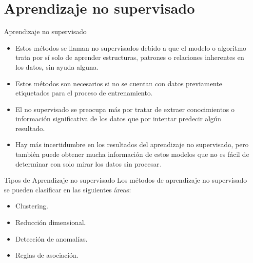 \documentclass[11pt,aspectratio=169]{beamer}
\begin{document}
\section{Aprendizaje no supervisado}
\begin{frame}{Aprendizaje no supervisado}
\begin{itemize}
	\item Estos métodos se llaman no supervisados debido a que el modelo o algoritmo trata por sí solo de aprender estructuras, 
		patrones o relaciones inherentes en los datos, sin ayuda alguna. \pause
	\item Estos métodos son necesarios si no se cuentan con datos previamente etiquetados para el proceso de entrenamiento.\pause
	\item El no supervisado se preocupa más por tratar de extraer conocimientos o información significativa de los datos que por intentar 
		predecir algún resultado.\pause 
	\item Hay más incertidumbre en los resultados del aprendizaje no supervisado, pero también puede obtener mucha información de estos 
		modelos que no es fácil de determinar con solo mirar los datos sin procesar.
\end{itemize}
\end{frame}

\begin{frame}{Tipos de Aprendizaje no supervisado}
Los métodos de aprendizaje no supervisado se pueden clasificar en las siguientes áreas: \pause
\begin{itemize}
	\item Clustering.\pause
	\item Reducción dimensional.\pause
	\item Detección de anomalías.\pause
	\item Reglas de asociación.
\end{itemize}
\end{frame}
\end{document}
